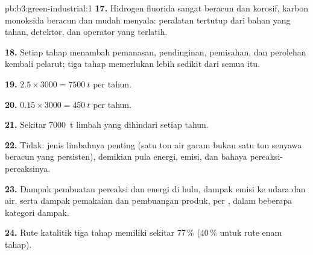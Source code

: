 \begin{solution}{pb:b3:green-industrial:1}
\textbf{17.} Hidrogen fluorida sangat beracun dan korosif, karbon monoksida beracun dan
mudah menyala: peralatan tertutup dari bahan yang tahan, detektor, dan operator
yang terlatih.

\textbf{18.} Setiap tahap menambah pemanasan, pendinginan, pemisahan, dan perolehan kembali pelarut; tiga
tahap memerlukan lebih sedikit dari semua itu.

\textbf{19.} $2.5 \times 3000 = \qty{7500}{t}$ per tahun.

\textbf{20.} $0.15 \times 3000 = \qty{450}{t}$ per tahun.

\textbf{21.} Sekitar \qty{7000}{t} limbah yang dihindari setiap tahun.

\textbf{22.} Tidak: jenis limbahnya penting (satu ton air garam bukan satu ton
senyawa beracun yang persisten), demikian pula energi, emisi, dan bahaya
pereaksi-pereaksinya.

\textbf{23.} Dampak pembuatan pereaksi dan energi di hulu, dampak emisi ke
udara dan air, serta dampak pemakaian dan pembuangan produk, per , dalam
beberapa kategori dampak.

\textbf{24.} Rute katalitik tiga tahap memiliki  sekitar 77\,\% (40\,\% untuk
rute enam tahap).
\end{solution}
